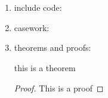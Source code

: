 \documentclass[12pt]{article}
\begin{document}
\section{}
    \begin{enumerate}
        \item
            include code:

        \item
            casework:

        \item
            theorems and proofs:
            \begin{theorem}
                this is a theorem
            \end{theorem}
            \begin{proof}
                This is a proof
            \end{proof}

    \end{enumerate}
\end{document}
